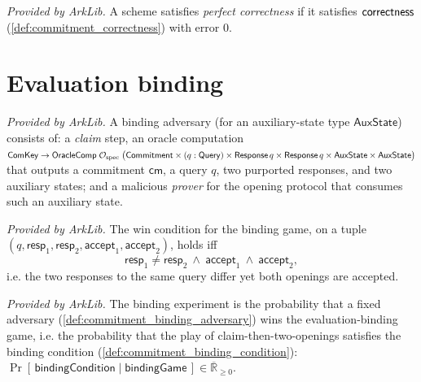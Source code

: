 \begin{definition}
  \label{def:commitment_perfect_correctness}
  \mathlibok
  \textit{Provided by ArkLib.}
  A scheme satisfies \emph{perfect correctness} if it satisfies $\mathsf{correctness}$
  (\cref{def:commitment_correctness}) with error $0$.
\end{definition}

\section{Evaluation binding}

\begin{definition}
  \label{def:commitment_binding_adversary}
  \mathlibok
  \textit{Provided by ArkLib.}
  A binding adversary (for an auxiliary-state type $\mathsf{AuxState}$) consists of:
  a \emph{claim} step, an oracle computation
  $\mathsf{ComKey} \to \mathsf{OracleComp}\;\mathcal{O}_{\mathrm{spec}}\;\bigl(\mathsf{Commitment} \times
  (q : \mathsf{Query}) \times \mathsf{Response}\,q \times \mathsf{Response}\,q \times
  \mathsf{AuxState} \times \mathsf{AuxState}\bigr)$ that outputs a commitment $\mathsf{cm}$,
  a query $q$, two purported responses, and two auxiliary states; and a malicious
  \emph{prover} for the opening protocol that consumes such an auxiliary state.
\end{definition}

\begin{definition}
  \label{def:commitment_binding_condition}
  \mathlibok
  \textit{Provided by ArkLib.}
  The win condition for the binding game, on a tuple
  $(q, \mathsf{resp}_1, \mathsf{resp}_2, \mathsf{accept}_1, \mathsf{accept}_2)$, holds iff
  \[
    \mathsf{resp}_1 \neq \mathsf{resp}_2 \ \wedge\ \mathsf{accept}_1 \ \wedge\ \mathsf{accept}_2,
  \]
  i.e. the two responses to the same query differ yet both openings are accepted.
\end{definition}

\begin{definition}
  \label{def:commitment_binding_experiment}
  \mathlibok
  \textit{Provided by ArkLib.}
  The binding experiment is the probability that a fixed adversary
  (\cref{def:commitment_binding_adversary}) wins the evaluation-binding game, i.e. the
  probability that the play of claim-then-two-openings satisfies the binding condition
  (\cref{def:commitment_binding_condition}):
  \(
    \Pr[\,\mathsf{bindingCondition} \mid \mathsf{bindingGame}\,] \in
    \overline{\mathbb{R}}_{\ge 0}.
  \)
\end{definition}

